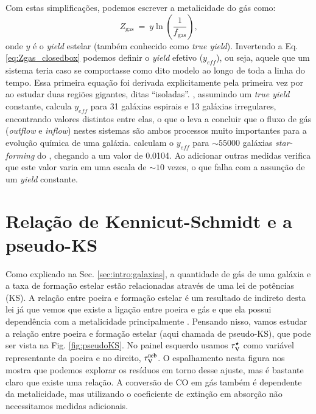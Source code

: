 Com estas simplificações, podemos escrever a metalicidade do gás como:
\begin{equation}
	Z_{\mathrm{gas}}\ =\ y \ln \left(\frac{1}{f_{\mathrm{gas}}}\right),
	\label{eq:Zgas_closedbox}
\end{equation}
\noindent onde $y$ é o {\em yield} estelar (também conhecido como {\em true yield}). Invertendo a
Eq. \ref{eq:Zgas_closedbox} podemos definir o {\em yield} efetivo ($y_{eff}$), ou seja, aquele que
um sistema teria caso se comportasse como dito modelo ao longo de toda a linha do tempo. Essa
primeira equação foi derivada explicitamente pela primeira vez por \citet{Searle.Sargent.1972a} ao
estudar duas regiões \Hii gigantes, ditas ``isoladas''. \citet{Garnett.2002a}, assumindo um {\em
true yield} constante, calcula $y_{eff}$ para 31 galáxias espirais e 13 galáxias irregulares,
encontrando valores distintos entre elas, o que o leva a concluir que o fluxo de gás ({\em outflow}
e {\em inflow}) nestes sistemas são ambos processos muito importantes para a evolução química de
uma galáxia. \citet{Tremonti.etal.2004a} calculam o $y_{eff}$ para $\sim 55000$ galáxias {\em
star-forming} do \SDSS, chegando a um valor de 0.0104. Ao adicionar outras medidas verifica que
este valor varia em uma escala de $\sim 10$ vezes, o que falha com a assunção de um {\em yield}
constante.

\section{Relação de Kennicut-Schmidt e a pseudo-KS}
\label{sec:gasfrac:KS}

Como explicado na Sec. \ref{sec:intro:galaxias}, a quantidade de gás de uma galáxia e a taxa de
formação estelar estão relacionadas através de uma lei de potências (KS). A relação entre poeira e
formação estelar é um resultado de indireto desta lei já que vemos que existe a ligação entre poeira
e gás e que ela possui dependência com a metalicidade principalmente \citep[][e suas
referências]{Magdis.etal.2011a, Leroy.etal.2011a, Santini.etal.2014a}. Pensando nisso, vamos estudar
a relação entre poeira e formação estelar (aqui chamada de pseudo-KS), que pode ser vista na Fig.
\ref{fig:pseudoKS}. No painel esquerdo usamos $\tau_{\mathrm{V}}^\star$ como variável representante da poeira e no
direito, $\tau_{\mathrm{V}}^{\mathrm{neb}}$. O espalhamento nesta figura nos mostra que podemos explorar os resíduos em torno
desse ajuste, mas é bastante claro que existe uma relação. A conversão de CO em gás também é
dependente da metalicidade, mas utilizando o coeficiente de extinção em absorção não necessitamos
medidas adicionais.

